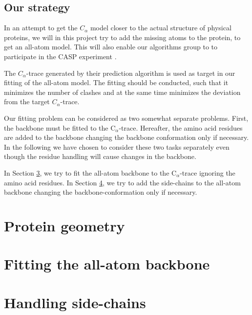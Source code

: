 \documentclass[10pt,a4paper,final,oneside,openany,article,twocolumn]{memoir}
\newcommand{\Ca}{C$_{\alpha}$}
\begin{document}
\section{Our strategy}
In an attempt to get the $C_\alpha$ model closer to the actual
structure of physical proteins, we will in this project try to add the
missing atoms to the protein, to get an all-atom model.  This will
also enable our algorithms group to to participate in the CASP
experiment \cite{caspwebsite}.

The $C_\alpha$-trace generated by their prediction algorithm is used
as target in our fitting of the all-atom model. The fitting should be
conducted, such that it minimizes the number of clashes and at the
same time minimizes the deviation from the target $C_\alpha$-trace.

Our fitting problem can be considered as two somewhat separate problems.
First, the backbone must be fitted to the \Ca-trace. 
Hereafter, the amino acid residues are added to the backbone changing the backbone conformation only if necessary.
In the following we have chosen to consider these two tasks separately even though the residue handling will cause changes in the backbone.

In Section \ref{chap:fitting_backbone}, we try to fit the all-atom backbone to the \Ca-trace ignoring the amino acid residues.
In Section \ref{chap:handling_sidechains}, we try to add the side-chains to the all-atom backbone changing the backbone-conformation only if necessary.


\chapter{Protein geometry}
\label{chap:protein_geometry}



\chapter{Fitting the all-atom backbone}
\label{chap:fitting_backbone}


\chapter{Handling side-chains}
\label{chap:handling_sidechains}

\end{document}
